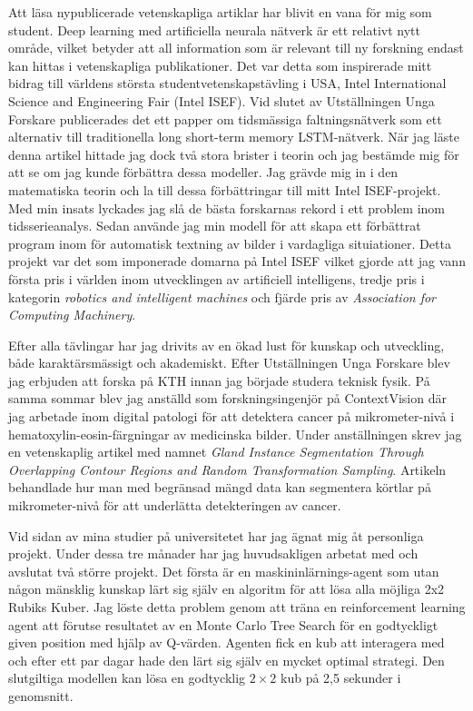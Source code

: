 \documentclass[11pt,a4paper]{article} %
\begin{document}
Att läsa nypublicerade vetenskapliga artiklar har blivit en vana för mig som student. Deep learning med artificiella neurala nätverk är ett relativt nytt område, vilket betyder att all information som är relevant till ny forskning endast kan hittas i vetenskapliga publikationer. Det var detta som inspirerade mitt bidrag till världens största studentvetenskapstävling i USA, Intel International Science and Engineering Fair (Intel ISEF). Vid slutet av Utställningen Unga Forskare publicerades det ett papper om tidsmässiga faltningsnätverk som ett alternativ till traditionella long short-term memory LSTM-nätverk. När jag läste denna artikel hittade jag dock två stora brister i teorin och jag bestämde mig för att se om jag kunde förbättra dessa modeller. Jag grävde mig in i den matematiska teorin och la till dessa förbättringar till mitt Intel ISEF-projekt. Med min insats lyckades jag slå de bästa forskarnas rekord i ett problem inom tidsserieanalys. Sedan använde jag min modell för att skapa ett förbättrat program inom för automatisk textning av bilder i vardagliga situiationer. Detta projekt var det som imponerade domarna på Intel ISEF vilket gjorde att jag vann första pris i världen inom utvecklingen av artificiell intelligens, tredje pris i kategorin \textit{robotics and intelligent machines} och fjärde pris av \textit{Association for Computing Machinery}. 

Efter alla tävlingar har jag drivits av en ökad lust för kunskap och utveckling, både karaktärsmässigt och akademiskt. Efter Utställningen Unga Forskare blev jag erbjuden att forska på KTH innan jag började studera teknisk fysik. På samma sommar blev jag anställd som forskningsingenjör på ContextVision där jag arbetade inom digital patologi för att detektera cancer på mikrometer-nivå i hematoxylin-eosin-färgningar av medicinska bilder. Under anställningen skrev jag en vetenskaplig artikel med namnet \textit{Gland Instance Segmentation Through Overlapping Contour Regions and Random Transformation Sampling}. Artikeln behandlade hur man med begränsad mängd data kan segmentera körtlar på mikrometer-nivå för att underlätta detekteringen av cancer.

Vid sidan av mina studier på universitetet har jag ägnat mig åt personliga projekt. Under dessa tre månader har jag huvudsakligen arbetat med och avslutat två större projekt. Det första är en maskininlärnings-agent som utan någon mänsklig kunskap lärt sig själv en algoritm för att lösa alla möjliga 2x2 Rubiks Kuber. Jag löste detta problem genom att träna en reinforcement learning agent att förutse resultatet av en Monte Carlo Tree Search för en godtyckligt given position med hjälp av Q-värden. Agenten fick en kub att interagera med och efter ett par dagar hade den lärt sig själv en mycket optimal strategi. Den slutgiltiga modellen kan lösa en godtycklig $2 \times 2$ kub på 2,5 sekunder i genomsnitt. 
\end{document}
